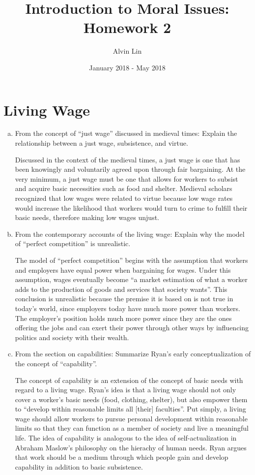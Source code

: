 \documentclass{article}
\title{Introduction to Moral Issues: Homework 2}
\author{Alvin Lin}
\date{January 2018 - May 2018}
\begin{document}
\maketitle

\section*{Living Wage}
\begin{enumerate}[a)]
  \item From the concept of ``just wage'' discussed in medieval times: Explain the relationship between a just wage, subsistence, and virtue.
  \par Discussed in the context of the medieval times, a just wage is one that has been knowingly and voluntarily agreed upon through fair bargaining. At the very minimum, a just wage must be one that allows for workers to subsist and acquire basic necessities such as food and shelter. Medieval scholars recognized that low wages were related to virtue because low wage rates would increase the likelihood that workers would turn to crime to fulfill their basic needs, therefore making low wages unjust.
  \item From the contemporary accounts of the living wage: Explain why the model of ``perfect competition'' is unrealistic.
  \par The model of ``perfect competition'' begins with the assumption that workers and employers have equal power when bargaining for wages. Under this assumption, wages eventually become ``a market estimation of what a worker adds to the production of goods and services that society wants''. This conclusion is unrealistic because the premise it is based on is not true in today's world, since employers today have much more power than workers. The employer's position holds much more power since they are the ones offering the jobs and can exert their power through other ways by influencing politics and society with their wealth.
  \item From the section on capabilities: Summarize Ryan's early conceptualization of the concept of ``capability''.
  \par The concept of capability is an extension of the concept of basic needs with regard to a living wage. Ryan's idea is that a living wage should not only cover a worker's basic needs (food, clothing, shelter), but also empower them to ``develop within reasonable limits all [their] faculties''. Put simply, a living wage should allow workers to pursue personal development within reasonable limits so that they can function as a member of society and live a meaningful life. The idea of capability is analogous to the idea of self-actualization in Abraham Maslow's philosophy on the hierachy of human needs. Ryan argues that work should be a medium through which people gain and develop capability in addition to basic subsistence.

\end{enumerate}
\end{document}
